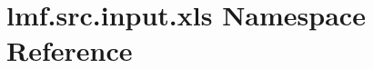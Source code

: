 \hypertarget{namespacelmf_1_1src_1_1input_1_1xls}{\section{lmf.\+src.\+input.\+xls Namespace Reference}
\label{namespacelmf_1_1src_1_1input_1_1xls}
}
